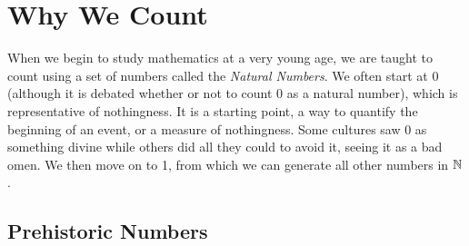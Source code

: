 \chapter{Why We Count}
\noindent

When we begin to study mathematics at a very young age, we are taught to count using a set of numbers called the \textit{Natural Numbers}. We often start at 0 (although it is debated whether or not to count 0 as a natural number), which is representative of nothingness. It is a starting point, a way to quantify the beginning of an event, or a measure of nothingness. Some cultures saw 0 as something divine while others did all they could to avoid it, seeing it as a bad omen. We then move on to 1, from which we can generate all other numbers in $\mathbb{N}$.

\section{Prehistoric Numbers}
\noindent

